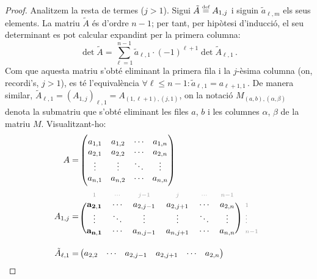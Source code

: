 \begin{proof}
	Analitzem la resta de termes ($j>1$). Sigui $\tilde{A} \stackrel{\text{\tiny def}}{=} A_{1,j}$ i siguin $\tilde{a}_{\ell,m}$ els seus elements. La matriu $\tilde{A}$ és d'ordre $n-1$; per tant, per hipòtesi d'inducció, el seu determinant es pot calcular expandint per la primera columna: 
	\begin{equation}\label{eq:subdet}
		\det \tilde{A} = \sum_{\ell=1}^{n-1}\tilde{a}_{\ell,1}\cdot (-1)^{\ell+1}\det \tilde{A}_{\ell,1}\,. 
	\end{equation} 
	Com que aquesta matriu s'obté eliminant la primera fila i la $j$-èsima columna (on, recordi's, $j>1$), es té l'equivalència $\forall \ell \le n-1 : {\tilde{a}_{\ell,1} = a_{\ell+1,1}}\,$. De manera similar, $\tilde{A}_{\ell,1} = (A_{1,j})_{\ell,1}= A_{(1,\ell+1),(j,1)}$, on la notació $M_{(a,b),(\alpha,\beta)}$ denota la submatriu que s'obté eliminant les files $a$, $b$ i les columnes $\alpha$, $\beta$ de la matriu $M$. Visualitzant-ho:
	\begin{equation*}
		\begin{split}
			A =&
			\begin{pmatrix}
				a_{1,1} & a_{1,2} & \cdots & a_{1,n} \\
				a_{2,1} & a_{2,2} & \cdots & a_{2,n} \\
				\vdots  & \vdots  & \ddots & \vdots  \\
				a_{n,1} & a_{n,2} & \cdots & a_{n,n} 
			\end{pmatrix}\\
			A_{1,j} =&\
			\begin{blockarray}{rcccccc}
				\begin{block}{*{7}{>{\scriptstyle\color[gray]{0.6}}c<{}}}
					1&	\cdots & j-1& j& \cdots & n-1 & \\
				\end{block}
				\begin{block}{(cccccc)*{1}{>{\scriptstyle\color[gray]{0.6}}l<{}}}
					\mathbf{a_{2,1}} & \cdots & a_{2,j-1} & a_{2,j+1} & \cdots & a_{2,n} & 1 \\
					\vdots & \ddots & \vdots & \vdots &	\ddots & \vdots & \vdots \\
					\mathbf{a_{n,1}}&   \cdots&	a_{n,j-1}&	a_{n,j+1}&	\cdots&		a_{n,n}&	n-1\\
				\end{block}
			\end{blockarray}\\
			\tilde{A}_{\ell,1} =&
			\begin{pmatrix}
				a_{2,2} & \cdots & a_{2,j-1} & a_{2,j+1} & \cdots & a_{2,n} \\

\end{pmatrix}
\end{split}
\end{equation*}
\end{proof}
